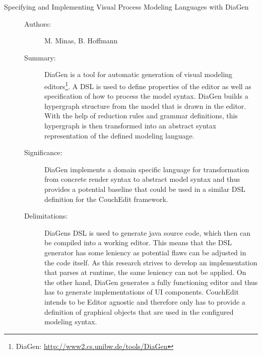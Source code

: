 \documentclass[10pt,a4paper,oneside]{scrartcl}
\begin{document}
\begin{description}
  \item[Specifying and Implementing Visual Process Modeling Languages with DiaGen] \cite{minas_specifying_2001}
        \begin{description}
          \item[Authors:] M. Minas, B. Hoffmann
          \item[Summary:] DiaGen is a tool for automatic generation of visual modeling editors\footnote{DiaGen: \url{http://www2.cs.unibw.de/tools/DiaGen}}. A DSL is used to define properties of the editor as well as specification of how to process the model syntax. DiaGen builds a hypergraph structure from the model that is drawn in the editor. With the help of reduction rules and grammar definitions, this hypergraph is then transformed into an abstract syntax representation of the defined modeling language.
          \item[Significance:]  DiaGen implements a domain specific language for transformation from concrete render syntax to abstract model syntax and thus provides a potential baseline that could be used in a similar DSL definition for the CouchEdit framework.
          \item[Delimitations:] DiaGens DSL is used to generate java source code, which then can be compiled into a working editor. This means that the DSL generator has some leniency as potential flaws can be adjusted in the code itself. As this research strives to develop an implementation that parses at runtime, the same leniency can not be applied. On the other hand, DiaGen generates a fully functioning editor and thus has to generate implementations of UI components. CouchEdit intends to be Editor agnostic and therefore only has to provide a definition of graphical objects that are used in the configured modeling syntax.

        \end{description}


\end{description}
\end{document}
